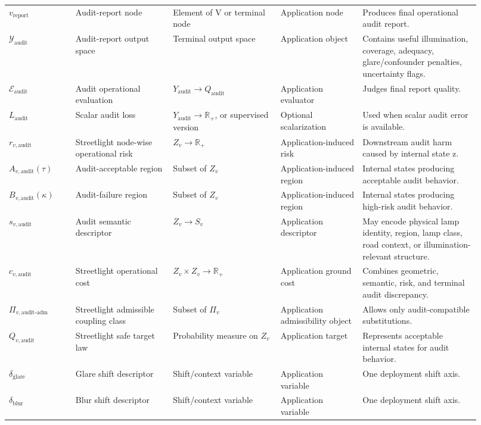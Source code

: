 \documentclass[11pt,a4paper]{article}
\begin{document}
\begin{landscape}
\begin{longtable}{@{}P{0.13\linewidth} P{0.19\linewidth} P{0.21\linewidth} P{0.16\linewidth} P{0.23\linewidth}@{}}
\(v_{\mathrm{report}}\) & Audit-report node & Element of V or terminal node & Application node & Produces final operational audit report.\\
\(\mathcal{Y}_{\mathrm{audit}}\) & Audit-report output space & Terminal output space & Application object & Contains useful illumination, coverage, adequacy, glare/confounder penalties, uncertainty flags.\\
\(\mathcal{E}_{\mathrm{audit}}\) & Audit operational evaluation & \(Y_{\mathrm{audit}}\to Q_{\mathrm{audit}}\) & Application evaluator & Judges final report quality.\\
\(L_{\mathrm{audit}}\) & Scalar audit loss & \(Y_{\mathrm{audit}}\to\mathbb{R}_+\), or supervised version & Optional scalarization & Used when scalar audit error is available.\\
\(r_{v,\mathrm{audit}}\) & Streetlight node-wise operational risk & \(Z_v\to\mathbb{R}_+\) & Application-induced risk & Downstream audit harm caused by internal state z.\\
\(A_{v,\mathrm{audit}}(\tau)\) & Audit-acceptable region & Subset of \(Z_v\) & Application-induced region & Internal states producing acceptable audit behavior.\\
\(B_{v,\mathrm{audit}}(\kappa)\) & Audit-failure region & Subset of \(Z_v\) & Application-induced region & Internal states producing high-risk audit behavior.\\
\(s_{v,\mathrm{audit}}\) & Audit semantic descriptor & \(Z_v\to S_v\) & Application descriptor & May encode physical lamp identity, region, lamp class, road context, or illumination-relevant structure.\\
\(c_{v,\mathrm{audit}}\) & Streetlight operational cost & \(Z_v\times Z_v\to\mathbb{R}_+\) & Application ground cost & Combines geometric, semantic, risk, and terminal audit discrepancy.\\
\(\Pi_{v,\mathrm{audit\text{-}adm}}\) & Streetlight admissible coupling class & Subset of \(\Pi_v\) & Application admissibility object & Allows only audit-compatible substitutions.\\
\(Q_{v,\mathrm{audit}}\) & Streetlight safe target law & Probability measure on \(Z_v\) & Application target & Represents acceptable internal states for audit behavior.\\
\(\delta_{\mathrm{glare}}\) & Glare shift descriptor & Shift/context variable & Application variable & One deployment shift axis.\\
\(\delta_{\mathrm{blur}}\) & Blur shift descriptor & Shift/context variable & Application variable & One deployment shift axis.\\

\end{longtable}
\end{landscape}
\end{document}
